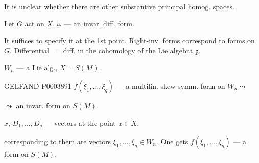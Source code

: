 It is unclear whether there are other substantive principal homog. spaces.


Let $G$ act on $X$, $\omega$ --- an invar. diff. form.

It suffices to specify it at the 1st point. Right-inv. forms correspond to forms on $G$.
Differential $=$ diff. in the cohomology of the Lie algebra $\mathfrak{g}$.

$W_n$ --- a Lie alg., $X=S (M)$.

\begin{GelfandAdjacentEvidence}{GELFAND-P000389}{1}
$f (\xi_1,\dots,\xi_q)$ --- a multilin. skew-symm. form on $W_n\leadsto$
\par\noindent $\leadsto$ an invar. form on $S (M)$.
\end{GelfandAdjacentEvidence}


$x$, $D_1,\dots, D_q$ --- vectors at the point $x\in X$.

corresponding to them are vectors $\xi_1,\dots,\xi_q\in W_n$. One gets
$f (\xi_1,\dots,\xi_q)$ --- a form on $S (M)$.

